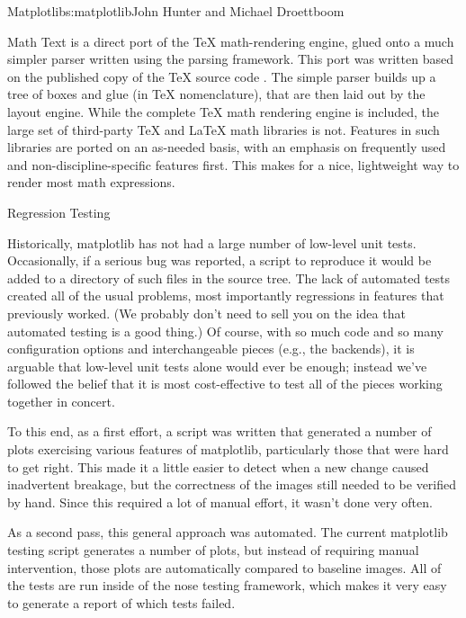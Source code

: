 \begin{aosachapter}{Matplotlib}{s:matplotlib}{John Hunter and Michael Droettboom}
\begin{aosasect1}{Math Text}
 is a direct port of the TeX math-rendering engine, glued
onto a much simpler parser written using the 
\cite{bib:pyparsing} parsing framework.  This port was written based
on the published copy of the TeX source code \cite{bib:texprogram}.
The simple parser builds up a tree of boxes and glue (in TeX
nomenclature), that are then laid out by the layout engine.  While the
complete TeX math rendering engine is included, the large set of
third-party TeX and LaTeX math libraries is not.  Features in such
libraries are ported on an as-needed basis, with an emphasis on
frequently used and non-discipline-specific features first.  This
makes for a nice, lightweight way to render most math expressions.

\end{aosasect1}

\begin{aosasect1}{Regression Testing}

Historically, matplotlib has not had a large number of low-level
unit tests.  Occasionally, if a serious bug was reported, a script
to reproduce it would be added to a directory of such files in the
source tree.  The lack of automated tests created all of the usual
problems, most importantly regressions in features that previously
worked.  (We probably don't need to sell you on the idea that
automated testing is a good thing.)  Of course, with so much code
and so many configuration options and interchangeable pieces
(e.g., the backends), it is arguable that low-level unit tests alone
would ever be enough; instead we've followed the belief that it is
most cost-effective to test all of the pieces working together in
concert.

To this end, as a first effort, a script was written that generated a
number of plots exercising various features of matplotlib,
particularly those that were hard to get right.  This made it a little
easier to detect when a new change caused inadvertent breakage, but
the correctness of the images still needed to be verified by hand.
Since this required a lot of manual effort, it wasn't done very often.

As a second pass, this general approach was automated.  The current
matplotlib testing script generates a number of plots, but instead of
requiring manual intervention, those plots are automatically compared
to baseline images.  All of the tests are run inside of the nose
testing framework, which makes it very easy to generate a report of
which tests failed.


\end{aosasect1}
\end{aosachapter}
